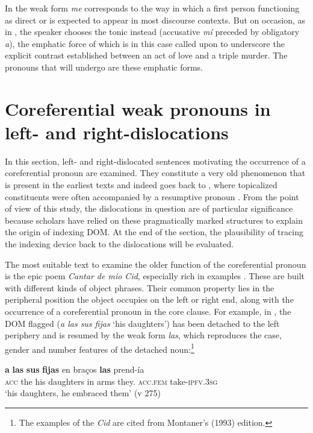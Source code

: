\documentclass[output=paper]{LSP/langsci}
\begin{document}
In  the weak form \textit{me} corresponds to the way in which a first person functioning as direct or  is expected to appear in most discourse contexts. But on occasion, as in , the speaker chooses the tonic instead (accusative \textit{mí} preceded by obligatory \textit{a}), the emphatic force of which is in this case called upon to underscore the explicit contrast established between an act of love and a triple murder. The pronouns that will undergo  are these emphatic forms.

\section{Coreferential weak pronouns in left- and right-\-dislocations}\label{04-me-sec:3}

In this section, left- and right-dislocated sentences motivating the occurrence of a coreferential pronoun are examined. They constitute a very old phenomenon that is present in the earliest  texts and indeed goes back to , where topicalized constituents were often accompanied by a resumptive pronoun \citep[198]{Pensado1995Creacion}. From the point of view of this study, the dislocations in question are of particular significance because scholars have relied on these pragmatically marked structures to explain the origin of  indexing DOM. At the end of the section, the plausibility of tracing the indexing device back to the dislocations will be evaluated.

The most suitable text to examine the older function of the coreferential pronoun is the epic poem \textit{Cantar de mio Cid}, especially rich in examples \citep[323]{MenendezPidal1964Cantar}. These are built with different kinds of object phrases. Their common property lies in the peripheral position the object occupies on the left or right end, along with the occurrence of a coreferential pronoun in the core clause. For example, in , the DOM flagged  (\textit{a las sus fijas} ‘his daughters’) has been detached to the left periphery and is resumed by the weak form \textit{las}, which reproduces the case, gender and number features of the detached noun:\footnote{The examples of the \textit{Cid} are cited from Montaner's (1993) edition.}

\begin{exe}
\ex%
\label{04-me-ex:4}
\gll \textbf{a} \textbf{las} \textbf{sus} \textbf{fijas} {\textbar} en braços \textbf{las} prend-ía\\
\textsc{acc} the his daughters { } in arms they.\textsc{ acc.fem} take-\textsc{ipfv.3sg}\\
\glt ‘his daughters, he embraced them’ (v 275)
\end{exe}
 
\end{document}
